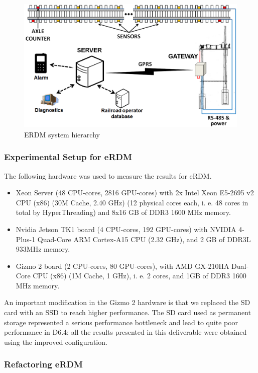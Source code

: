 \begin{figure}[!ht]
\centering
\includegraphics[scale=0.4]{figures/erdm_sysoverview.png}
\caption{ERDM system hierarchy}
\label{fig:erdm_sysoverview}
\end{figure}

\subsubsection{Experimental Setup for eRDM}

The following hardware was used to measure the results for eRDM.
\begin{itemize}
	\item Xeon Server (48 CPU-cores, 2816 GPU-cores) with 2x Intel Xeon E5-2695 v2 CPU (x86) (30M Cache, 2.40 GHz) (12 physical cores each, i. e. 48 cores in total by HyperThreading) and 8x16 GB of DDR3 1600 MHz memory.
	\item Nvidia Jetson TK1 board (4 CPU-cores, 192 GPU-cores) with NVIDIA 4-Plus-1 Quad-Core ARM Cortex-A15 CPU (2.32 GHz), and 2 GB of DDR3L 933MHz memory.
	\item Gizmo 2 board (2 CPU-cores, 80 GPU-cores), with AMD GX-210HA Dual-Core CPU (x86) (1M Cache, 1 GHz), i. e. 2 cores, and 1GB of DDR3 1600 MHz memory.
\end{itemize}
An important modification in the Gizmo 2 hardware is that we replaced the SD card with an SSD to reach higher performance. The SD card used as permanent storage represented a serious performance bottleneck and lead to quite poor performance in D6.4; all the results presented in this deliverable were obtained using the improved configuration.

\subsubsection{Refactoring eRDM}

